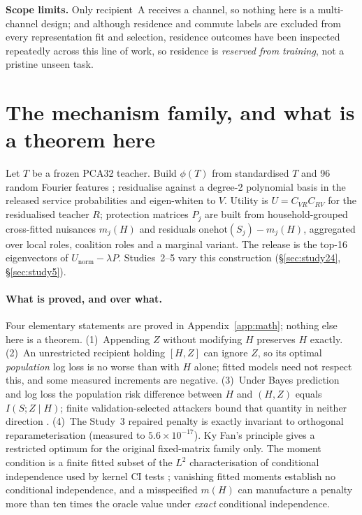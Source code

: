 \documentclass[10pt]{article}
\begin{document}
\textbf{Scope limits.} Only recipient~A receives a channel, so nothing here is a multi-channel design; and
although residence and commute labels are excluded from every representation fit and selection, residence
outcomes have been inspected repeatedly across this line of work, so residence is \emph{reserved from
training}, not a pristine unseen task.

\section{The mechanism family, and what is a theorem here}
\label{sec:method}

Let $T$ be a frozen PCA32 teacher. Build $\phi(T)$ from standardised $T$ and 96 random Fourier features
\citep{rahimi2007random}; residualise against a degree-2 polynomial basis in the released service
probabilities and eigen-whiten to $V$. Utility is $U=C_{VR}C_{RV}$ for the residualised teacher $R$;
protection matrices $P_j$ are built from household-grouped cross-fitted nuisances $m_j(H)$
\citep{chernozhukov2016dml} and residuals $\mathrm{onehot}(S_j)-m_j(H)$, aggregated over local roles,
coalition roles and a marginal variant. The release is the top-16 eigenvectors of $U_{\mathrm{norm}}-\lambda P$.
Studies~2--5 vary this construction (\S\ref{sec:study24}, \S\ref{sec:study5}).

\paragraph{What is proved, and over what.} Four elementary statements are proved in
Appendix~\ref{app:math}; nothing else here is a theorem. (1)~Appending $Z$ without modifying $H$
preserves $H$ exactly. (2)~An unrestricted recipient holding $[H,Z]$ can ignore $Z$, so its optimal
\emph{population} log loss is no worse than with $H$ alone; fitted models need not respect this, and some
measured increments are negative. (3)~Under Bayes prediction and log loss the population risk difference
between $H$ and $(H,Z)$ equals $I(S;Z\mid H)$; finite validation-selected attackers bound that quantity in
neither direction \citep{mcallester2020formal}. (4)~The Study~3 repaired penalty is exactly invariant to
orthogonal reparameterisation (measured to $5.6\times10^{-17}$). Ky Fan's principle \citep{fan1949weyl}
gives a restricted optimum for the original fixed-matrix family only. The moment condition is a finite
fitted subset of the $L^2$ characterisation of conditional independence used by kernel CI tests
\citep{zhang2011kci,strobl2019rcit}; vanishing fitted moments establish no conditional independence, and a
misspecified $m(H)$ can manufacture a penalty more than ten times the oracle value under \emph{exact}
conditional independence.
\end{document}
